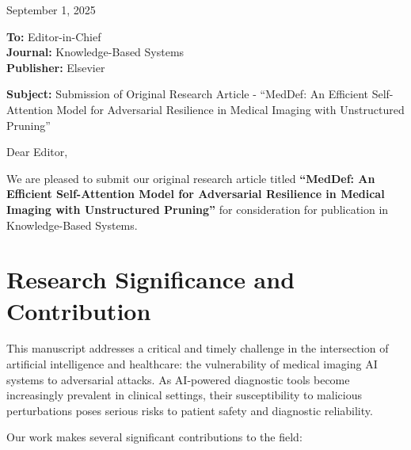 \documentclass[12pt]{article}
\begin{document}
\begin{flushright}
September 1, 2025
\end{flushright}

\vspace{0.5cm}

\noindent
\textbf{To:} Editor-in-Chief \\
\textbf{Journal:} Knowledge-Based Systems \\
\textbf{Publisher:} Elsevier

\vspace{0.5cm}

\noindent
\textbf{Subject:} Submission of Original Research Article - ``MedDef: An Efficient Self-Attention Model for Adversarial Resilience in Medical Imaging with Unstructured Pruning''

\vspace{1cm}

\noindent
Dear Editor,

\vspace{0.5cm}

We are pleased to submit our original research article titled \textbf{``MedDef: An Efficient Self-Attention Model for Adversarial Resilience in Medical Imaging with Unstructured Pruning''} for consideration for publication in Knowledge-Based Systems.

\section*{Research Significance and Contribution}

This manuscript addresses a critical and timely challenge in the intersection of artificial intelligence and healthcare: the vulnerability of medical imaging AI systems to adversarial attacks. As AI-powered diagnostic tools become increasingly prevalent in clinical settings, their susceptibility to malicious perturbations poses serious risks to patient safety and diagnostic reliability.

Our work makes several significant contributions to the field:
\end{document}
